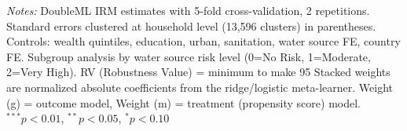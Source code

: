 \begin{table}[htbp]
\begin{tabular}{lccccccc}
\midrule
\bottomrule
\end{tabular}
\begin{minipage}{\textwidth}
\footnotesize
\textit{Notes:} DoubleML IRM estimates with 5-fold cross-validation, 2 repetitions. 
Standard errors clustered at household level (13,596 clusters) in parentheses. 
Controls: wealth quintiles, education, urban, sanitation, water source FE, country FE. 
Subgroup analysis by water source risk level (0=No Risk, 1=Moderate, 2=Very High). 
RV (Robustness Value) = minimum %
to make 95%
Stacked weights are normalized absolute coefficients from the ridge/logistic meta-learner. 
Weight (g) = outcome model, Weight (m) = treatment (propensity score) model. 
$^{***}p<0.01$, $^{**}p<0.05$, $^{*}p<0.10$
\end{minipage}
\end{table}